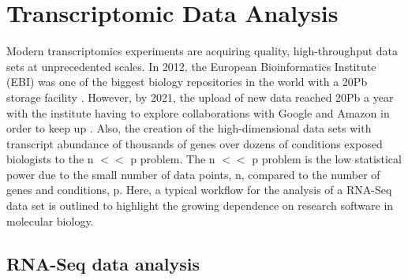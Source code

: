 \documentclass[../main.tex]{subfiles}
\begin{document}
\newpage

\section{Transcriptomic Data Analysis}

Modern transcriptomics experiments are acquiring quality, high-throughput data sets at unprecedented scales. 
In 2012, the European Bioinformatics Institute (EBI) was one of the biggest biology repositories in the world with a 20Pb storage facility \parencite{EBI2012}. 
However, by 2021, the upload of new data reached 20Pb a year with the institute having to explore collaborations with Google and Amazon in order to keep up \parencite{EBI2021}.
Also, the creation of the high-dimensional data sets with transcript abundance of thousands of genes over dozens of conditions exposed biologists to the n $<<$ p problem.
The n $<<$ p problem is the low statistical power due to the small number of data points, n, compared to the number of genes and conditions, p.
Here, a typical workflow for the analysis of a RNA-Seq data set is outlined to highlight the growing dependence on research software in molecular biology.

\subsection{RNA-Seq data analysis}
\end{document}
